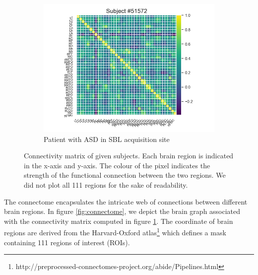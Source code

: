 \begin{figure}[h!]
    \hfill
    \begin{subfigure}{0.3\textwidth}
        \centering
        \includegraphics[width=\textwidth]{figures/ex_connectivity_matrix_sbl_ASD.png}
        \caption{\centering Patient with ASD in SBL acquisition site \qquad }
        \Description{}
    \end{subfigure}
    \caption{Connectivity matrix of given subjects. Each brain region is indicated in the x-axis and y-axis. The colour of the pixel indicates the strength of the functional connection between the two regions. We did not plot all 111 regions for the sake of readability.}
    \Description{}
    \label{fig:connectivity_matrix}
\end{figure}

The connectome encapsulates the intricate web of connections between different brain regions. In figure \ref{fig:connectome}, we depict the brain graph associated with the connectivity matrix computed in figure \ref{fig:connectivity_matrix}. The coordinate of brain regions are derived from the Harvard-Oxford atlas\footnote{http://preprocessed-connectomes-project.org/abide/Pipelines.html} which defines a mask containing 111 regions of interest (ROIs).

